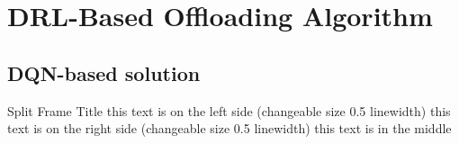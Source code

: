 \section{DRL-Based Offloading Algorithm}
\subsection{DQN-based solution}

\begin{splitframe}{0.5}{0.5}{Split Frame Title}
{this text is on the left side (changeable size 0.5 linewidth)}
{this text is on the right side (changeable size 0.5 linewidth)}
this text is in the middle
\end{splitframe}